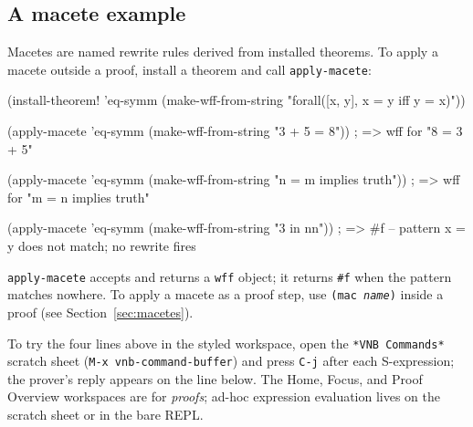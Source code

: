 \subsection{A macete example}
\label{sec:quickstart-macete}

Macetes are named rewrite rules derived from installed theorems.
To apply a macete outside a proof, install a theorem and call
\texttt{apply-macete}:

\begin{VNBcode}
(install-theorem! 'eq-symm
  (make-wff-from-string "forall([x, y], x = y iff y = x)"))

(apply-macete 'eq-symm (make-wff-from-string "3 + 5 = 8"))
; => wff for "8 = 3 + 5"

(apply-macete 'eq-symm (make-wff-from-string "n = m implies truth"))
; => wff for "m = n implies truth"

(apply-macete 'eq-symm (make-wff-from-string "3 in nn"))
; => #f          -- pattern x = y does not match; no rewrite fires
\end{VNBcode}

\texttt{apply-macete} accepts and returns a \texttt{wff} object; it
returns \texttt{\#f} when the pattern matches nowhere.
To apply a macete as a proof step, use
\texttt{(mac \textit{name})} inside a proof (see
Section~\ref{sec:macetes}).

\begin{remark}
To try the four lines above in the styled workspace, open the
\texttt{*VNB Commands*} scratch sheet (\texttt{M-x vnb-command-buffer})
and press \texttt{C-j} after each S-expression; the prover's reply
appears on the line below.  The Home, Focus, and Proof Overview
workspaces are for \emph{proofs}; ad-hoc expression evaluation lives
on the scratch sheet or in the bare REPL.
\end{remark}



